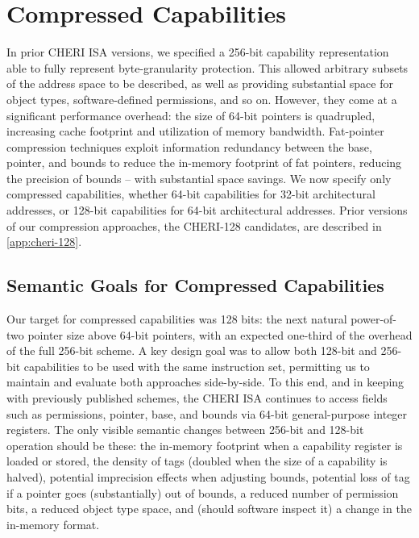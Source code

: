 \section{Compressed Capabilities}
\label{sec:rational:comressed}
In prior CHERI ISA versions, we specified a 256-bit capability
representation able to fully represent byte-granularity protection.
This allowed arbitrary subsets of the address space to be described, as well as
providing substantial
space for object types, software-defined permissions, and so on.
However, they come at a significant performance overhead: the size of 64-bit
pointers is quadrupled, increasing cache footprint and utilization of memory
bandwidth.
Fat-pointer compression techniques exploit information redundancy between the
base, pointer, and bounds to reduce the in-memory footprint of fat pointers,
reducing the precision of bounds -- with substantial space savings.
We now specify only compressed capabilities, whether 64-bit capabilities for
32-bit architectural addresses, or 128-bit capabilities for 64-bit
architectural addresses.
Prior versions of our compression approaches, the CHERI-128 candidates, are
described in \cref{app:cheri-128}.

\subsection{Semantic Goals for Compressed Capabilities}

Our target for compressed capabilities was 128 bits: the next natural
power-of-two pointer size above 64-bit pointers, with an expected one-third of
the overhead of the full 256-bit scheme.
A key design goal was to allow both 128-bit and 256-bit capabilities to be
used with the same instruction set, permitting us to maintain and evaluate
both approaches side-by-side.
To this end, and in keeping with previously published schemes, the CHERI ISA
continues to access fields such as permissions, pointer, base, and bounds via
64-bit general-purpose integer registers.
The only visible semantic changes between 256-bit and 128-bit operation should
be these:
the in-memory footprint when a capability register is loaded or stored,
the density of tags (doubled when the size of a capability is halved),
potential imprecision effects when adjusting bounds, potential loss of tag if
a pointer goes (substantially) out of bounds, a reduced number of permission
bits, a reduced object type space, and (should software inspect it) a change
in the in-memory format.

